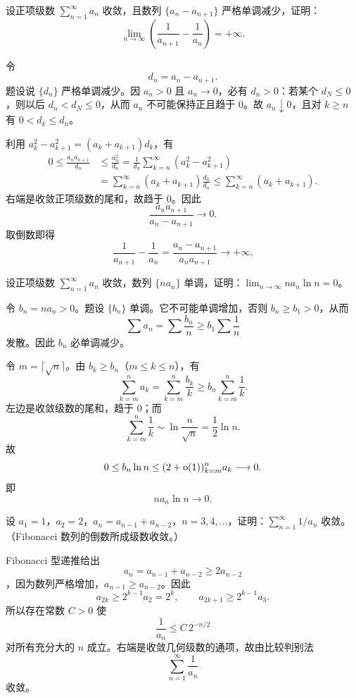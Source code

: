\begin{xreferenceproblem}[12]
设正项级数 $\sum_{n=1}^{\infty}a_n$ 收敛，且数列 $\{a_n-a_{n+1}\}$ 严格单调减少，证明：
\[
\lim_{n\to\infty}\left(\frac1{a_{n+1}}-\frac1{a_n}\right)=+\infty.
\]
\end{xreferenceproblem}
\begin{xsolution}
令
\[
 d_n=a_n-a_{n+1}.
\]
题设说 $\{d_n\}$ 严格单调减少。因 $a_n>0$ 且 $a_n\to0$，必有 $d_n>0$：若某个 $d_N\leq0$，则以后 $d_n<d_N\leq0$，从而 $a_n$ 不可能保持正且趋于 $0$。故 $a_n\downarrow0$，且对 $k\geq n$ 有 $0<d_k\leq d_n$。

利用 $a_k^2-a_{k+1}^2=(a_k+a_{k+1})d_k$，有
\[
 \begin{aligned}
 0\leq\frac{a_na_{n+1}}{d_n}
 &\leq\frac{a_n^2}{d_n}
 =\frac1{d_n}\sum_{k=n}^{\infty}(a_k^2-a_{k+1}^2)\\
 &=\sum_{k=n}^{\infty}(a_k+a_{k+1})\frac{d_k}{d_n}
 \leq\sum_{k=n}^{\infty}(a_k+a_{k+1}).
 \end{aligned}
\]
右端是收敛正项级数的尾和，故趋于 $0$。因此
\[
 \frac{a_na_{n+1}}{a_n-a_{n+1}}\longrightarrow0.
\]
取倒数即得
\[
 \boxed{\frac1{a_{n+1}}-\frac1{a_n}
 =\frac{a_n-a_{n+1}}{a_na_{n+1}}\longrightarrow+\infty}.
\]
\end{xsolution}


\begin{xreferenceproblem}[13]
设正项级数 $\sum_{n=1}^{\infty}a_n$ 收敛，数列 $\{na_n\}$ 单调，证明：$\lim_{n\to\infty}na_n\ln n=0$。
\end{xreferenceproblem}
\begin{xsolution}
令 $b_n=na_n>0$。题设 $\{b_n\}$ 单调。它不可能单调增加，否则 $b_n\geq b_1>0$，从而
\[
 \sum a_n=\sum\frac{b_n}{n}\geq b_1\sum\frac1n
\]
发散。因此 $b_n$ 必单调减少。

令 $m=\lceil\sqrt n\rceil$。由 $b_k\geq b_n$（$m\leq k\leq n$），有
\[
 \sum_{k=m}^{n}a_k
 =\sum_{k=m}^{n}\frac{b_k}{k}
 \geq b_n\sum_{k=m}^{n}\frac1k.
\]
左边是收敛级数的尾和，趋于 $0$；而
\[
 \sum_{k=m}^{n}\frac1k\sim\ln\frac n{\sqrt n}=\frac12\ln n.
\]
故
\[
 0\leq b_n\ln n
 \leq(2+\mathrm{o}(1))\relax_{k=m}^{n}a_k\longrightarrow0.
\]
即
\[
 \boxed{na_n\ln n\to0.}
\]
\end{xsolution}


\begin{xreferenceproblem}[14]
设 $a_1=1$，$a_2=2$，$a_n=a_{n-1}+a_{n-2}$，$n=3,4,\ldots$，证明：$\sum_{n=1}^{\infty}1/a_n$ 收敛。（Fibonacci 数列的倒数所成级数收敛。）
\end{xreferenceproblem}
\begin{xsolution}
Fibonacci 型递推给出
\[
 a_n=a_{n-1}+a_{n-2}\geq2a_{n-2}
\]
，因为数列严格增加，$a_{n-1}\geq a_{n-2}$。因此
\[
 a_{2k}\geq2^{k-1}a_2=2^k,
 \qquad
 a_{2k+1}\geq2^{k-1}a_3.
\]
所以存在常数 $C>0$ 使
\[
 \frac1{a_n}\leq C\,2^{-n/2}
\]
对所有充分大的 $n$ 成立。右端是收敛几何级数的通项，故由比较判别法
\[
 \sum_{n=1}^{\infty}\frac1{a_n}
\]
收敛。
\end{xsolution}



